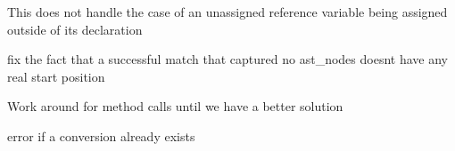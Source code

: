\begin{DoxyRefList}
%
This does not handle the case of an unassigned reference variable being assigned outside of its declaration  
\item[Member \mbox{\hyperlink{classchaiscript_1_1parser_1_1ChaiScript__Parser_a16b59446bdc7cb4be5492ba01bbc5cb2}{chaiscript\+::parser\+::Chai\+Script\+\_\+\+Parser$<$ Tracer, Optimizer, Parse\+\_\+\+Depth $>$\+::build\+\_\+match}} (size\+\_\+t t\+\_\+match\+\_\+start, std\+::string t\+\_\+text=\char`\"{}\char`\"{})]\label{todo__todo000015}%
%
fix the fact that a successful match that captured no ast\+\_\+nodes doesn\textquotesingle{}t have any real start position  
\item[Member \mbox{\hyperlink{classchaiscript_1_1parser_1_1ChaiScript__Parser_a8e14fbb6c0b2545c4602af6598abcbcb}{chaiscript\+::parser\+::Chai\+Script\+\_\+\+Parser$<$ Tracer, Optimizer, Parse\+\_\+\+Depth $>$\+::Dot\+\_\+\+Fun\+\_\+\+Array}} ()]\label{todo__todo000016}%
%
Work around for method calls until we have a better solution  
\item[Member \mbox{\hyperlink{classchaiscript_1_1Type__Conversions_a20a1cf396152c06b23af93ff01063d1e}{chaiscript\+::Type\+\_\+\+Conversions\+::add\+\_\+conversion}} (const std\+::shared\+\_\+ptr$<$ detail\+::\+Type\+\_\+\+Conversion\+\_\+\+Base $>$ \&conversion)]\label{todo__todo000012}%
%
error if a conversion already exists 
\end{DoxyRefList}